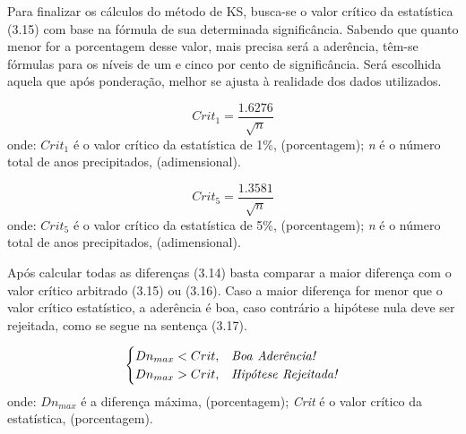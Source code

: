 Para finalizar os cálculos do método de KS, busca-se o valor crítico da estatística (3.15) com base na fórmula de sua determinada significância. Sabendo que quanto menor for a porcentagem desse valor, mais precisa será a aderência, têm-se fórmulas para os níveis de um e cinco por cento de significância. Será escolhida aquela que após ponderação, melhor se ajusta à realidade dos dados utilizados.\bigskip

\begin{equation}
Crit_1 = \frac{1.6276}{\sqrt{n}}
\end{equation}
\newline
onde:
\newline
$Crit_1$ é o valor crítico da estatística de 1\%, (porcentagem);
\newline
\textit{n} é o número total de anos precipitados, (adimensional).\bigskip

\begin{equation}
Crit_5 = \frac{1.3581}{\sqrt{n}}
\end{equation}
\newline
onde:
\newline
$Crit_5$ é o valor crítico da estatística de 5\%, (porcentagem);
\newline
\textit{n} é o número total de anos precipitados, (adimensional).\bigskip

Após calcular todas as diferenças (3.14) basta comparar a maior diferença com o valor crítico arbitrado (3.15) ou (3.16). Caso a maior diferença for menor que o valor crítico estatístico, a aderência é boa, caso contrário a hipótese nula deve ser rejeitada, como se segue na sentença (3.17).\bigskip

\begin{equation}
\begin{cases}
Dn_{max}<Crit,&\mbox{\textit{Boa }}\mbox{\textit{Aderência!}} \\
Dn_{max}>Crit,&\mbox{\textit{Hipótese }}\mbox{\textit{Rejeitada!}}
\end{cases}
\end{equation}
\newline
onde:
\newline
$Dn_{max}$ é a diferença máxima, (porcentagem);
\newline
\textit{Crit} é o valor crítico da estatística, (porcentagem).\bigskip

\bigskip

